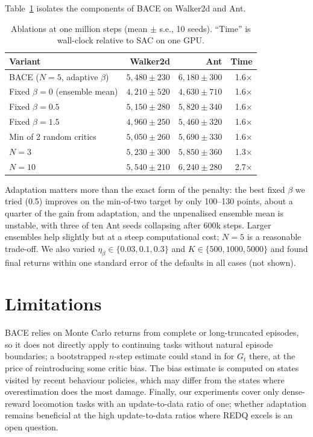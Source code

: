 \documentclass[10pt,twocolumn,letterpaper]{article}
\newcommand{\method}{\textsc{BACE}}
\begin{document}
Table~\ref{tab:ablation} isolates the components of \method{} on Walker2d and Ant.

\begin{table}[t]
\centering
\caption{Ablations at one million steps (mean $\pm$ s.e., 10 seeds). ``Time'' is wall-clock relative to SAC on one GPU.}
\label{tab:ablation}
\small
\begin{tabular}{@{}lrrr@{}}
\toprule
Variant & Walker2d & Ant & Time \\
\midrule
\method{} ($N=5$, adaptive $\beta$) & $5{,}480 \pm 230$ & $6{,}180 \pm 300$ & 1.6$\times$ \\
\midrule
Fixed $\beta = 0$ (ensemble mean) & $4{,}210 \pm 520$ & $4{,}630 \pm 710$ & 1.6$\times$ \\
Fixed $\beta = 0.5$ & $5{,}150 \pm 280$ & $5{,}820 \pm 340$ & 1.6$\times$ \\
Fixed $\beta = 1.5$ & $4{,}960 \pm 250$ & $5{,}460 \pm 320$ & 1.6$\times$ \\
Min of 2 random critics & $5{,}050 \pm 260$ & $5{,}690 \pm 330$ & 1.6$\times$ \\
\midrule
$N = 3$ & $5{,}230 \pm 300$ & $5{,}850 \pm 360$ & 1.3$\times$ \\
$N = 10$ & $5{,}540 \pm 210$ & $6{,}240 \pm 280$ & 2.7$\times$ \\
\bottomrule
\end{tabular}
\end{table}

Adaptation matters more than the exact form of the penalty: the best fixed $\beta$ we tried (0.5) improves on the min-of-two target by only 100--130 points, about a quarter of the gain from adaptation, and the unpenalised ensemble mean is unstable, with three of ten Ant seeds collapsing after 600k steps. Larger ensembles help slightly but at a steep computational cost; $N=5$ is a reasonable trade-off. We also varied $\eta_\beta\in\{0.03, 0.1, 0.3\}$ and $K\in\{500, 1000, 5000\}$ and found final returns within one standard error of the defaults in all cases (not shown).

\section{Limitations}
\label{sec:limitations}

\method{} relies on Monte Carlo returns from complete or long-truncated episodes, so it does not directly apply to continuing tasks without natural episode boundaries; a bootstrapped $n$-step estimate could stand in for $G_t$ there, at the price of reintroducing some critic bias. The bias estimate is computed on states visited by recent behaviour policies, which may differ from the states where overestimation does the most damage. Finally, our experiments cover only dense-reward locomotion tasks with an update-to-data ratio of one; whether adaptation remains beneficial at the high update-to-data ratios where REDQ excels is an open question.
\end{document}
